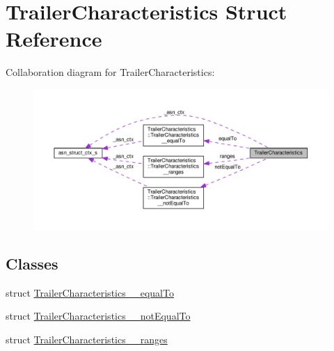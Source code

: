 \hypertarget{structTrailerCharacteristics}{}\section{Trailer\+Characteristics Struct Reference}
\label{structTrailerCharacteristics}


Collaboration diagram for Trailer\+Characteristics\+:\nopagebreak
\begin{figure}[H]
\begin{center}
\leavevmode
\includegraphics[width=350pt]{structTrailerCharacteristics__coll__graph}
\end{center}
\end{figure}
\subsection*{Classes}
\begin{DoxyCompactItemize}
\item 
struct \hyperlink{structTrailerCharacteristics_1_1TrailerCharacteristics____equalTo}{Trailer\+Characteristics\+\_\+\+\_\+equal\+To}
\item 
struct \hyperlink{structTrailerCharacteristics_1_1TrailerCharacteristics____notEqualTo}{Trailer\+Characteristics\+\_\+\+\_\+not\+Equal\+To}
\item 
struct \hyperlink{structTrailerCharacteristics_1_1TrailerCharacteristics____ranges}{Trailer\+Characteristics\+\_\+\+\_\+ranges}
\end{DoxyCompactItemize}

